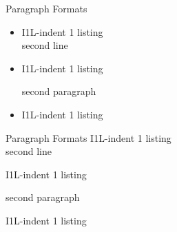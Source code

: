 \documentclass[english,notes]{beamer}
\begin{document}
\makeatletter
\ikr@gridfalse
\makeatother

\begin{frame}{Paragraph Formats}
\begin{itemize}
    \item I1L-indent 1 listing\\
    second line
    \item I1L-indent 1 listing\par
    second paragraph
    \item I1L-indent 1 listing
\end{itemize}
\end{frame}

\begin{frame}{Paragraph Formats}
I1L-indent 1 listing\\
second line

I1L-indent 1 listing\par
second paragraph

I1L-indent 1 listing
\end{frame}
\end{document}
